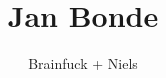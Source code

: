 \documentclass[a4paper,11pt]{article}
\title{Jan Bonde}
\author{Brainfuck + Niels}
\begin{document}
\maketitle

\begin{sketch}

\end{sketch}
\end{document}
